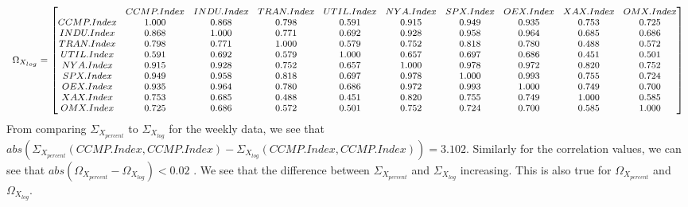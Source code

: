 \documentclass{article}
\begin{document}
\begin{equation*}
\begin{medsize}
\Omega_{X_{log}}=%
\begin{bmatrix}{}
& CCMP.Index & INDU.Index & TRAN.Index & UTIL.Index & NYA.Index & SPX.Index & OEX.Index & XAX.Index & OMX.Index \\ 
  CCMP.Index & 1.000 & 0.868 & 0.798 & 0.591 & 0.915 & 0.949 & 0.935 & 0.753 & 0.725 \\ 
  INDU.Index & 0.868 & 1.000 & 0.771 & 0.692 & 0.928 & 0.958 & 0.964 & 0.685 & 0.686 \\ 
  TRAN.Index & 0.798 & 0.771 & 1.000 & 0.579 & 0.752 & 0.818 & 0.780 & 0.488 & 0.572 \\ 
  UTIL.Index & 0.591 & 0.692 & 0.579 & 1.000 & 0.657 & 0.697 & 0.686 & 0.451 & 0.501 \\ 
  NYA.Index & 0.915 & 0.928 & 0.752 & 0.657 & 1.000 & 0.978 & 0.972 & 0.820 & 0.752 \\ 
  SPX.Index & 0.949 & 0.958 & 0.818 & 0.697 & 0.978 & 1.000 & 0.993 & 0.755 & 0.724 \\ 
  OEX.Index & 0.935 & 0.964 & 0.780 & 0.686 & 0.972 & 0.993 & 1.000 & 0.749 & 0.700 \\ 
  XAX.Index & 0.753 & 0.685 & 0.488 & 0.451 & 0.820 & 0.755 & 0.749 & 1.000 & 0.585 \\ 
  OMX.Index & 0.725 & 0.686 & 0.572 & 0.501 & 0.752 & 0.724 & 0.700 & 0.585 & 1.000 \\ 
  \end{bmatrix}
\end{medsize}
\end{equation*}
From comparing \(\Sigma_{X_{percent}}\) to \(\Sigma_{X_{log}}\) for the weekly data, we see that \(abs(\Sigma_{X_{percent}}(CCMP.Index,CCMP.Index) - \Sigma_{X_{log}}(CCMP.Index,CCMP.Index)) = 3.102 \). Similarly for the correlation values, we can see that \(abs(\Omega_{X_{percent}}- \Omega_{X_{log}}) < 0.02 \) . We see that the difference between \(\Sigma_{X_{percent}}\) and \(\Sigma_{X_{log}}\) increasing. This is also true for \(\Omega_{X_{percent}}\) and \(\Omega_{X_{log}}\).
\end{document}
